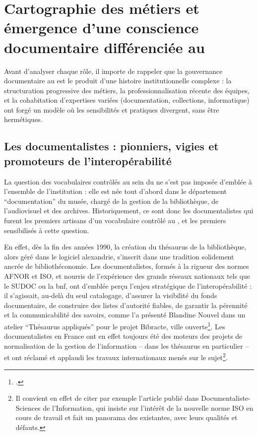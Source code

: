 \section{\label{II-B-1}Cartographie des métiers et émergence d’une conscience documentaire différenciée au \mae}

Avant d’analyser chaque rôle, il importe de rappeler que la gouvernance documentaire au \mae est le produit d’une histoire institutionnelle complexe : la structuration progressive des métiers, la professionnalisation récente des équipes, et la cohabitation d’expertises variées (documentation, collections, informatique) ont forgé un modèle où les sensibilités et pratiques divergent, sans être hermétiques.

\subsection{Les documentalistes : pionniers, vigies et promoteurs de l’interopérabilité}

La question des vocabulaires contrôlés au sein du \mae ne s’est pas imposée d’emblée à l’ensemble de l’institution : elle est née tout d'abord dans le département \enquote{documentation} du musée, chargé de la gestion de la bibliothèque, de l'audiovisuel et des archives. Historiquement, ce sont donc les documentalistes qui furent les premiers artisans d'un vocabulaire contrôlé au \mae, et les premiers sensibilisés à cette question.

En effet, dès la fin des années 1990, la création du thésaurus de la bibliothèque, alors géré dans le logiciel \gls{alexandrie}, s’inscrit dans une tradition solidement ancrée de bibliothéconomie. Les documentalistes, formés à la rigueur des normes AFNOR et ISO, et nourris de l’expérience des grands réseaux nationaux tels que le SUDOC ou la \ac{bnf}, ont d’emblée perçu l’enjeu stratégique de l’interopérabilité : il s’agissait, au-delà du seul catalogage, d’assurer la visibilité du fonds documentaire, de construire des listes d’autorité fiables, de garantir la pérennité et la communicabilité des savoirs, comme l'a présenté Blandine Nouvel dans un atelier \enquote{Thésaurus appliqués} pour le projet Bibracte, ville ouverte\footcite{nouvelOutilsDindexationBibliothecaires2022}. Les documentalistes en France ont en effet toujours été des moteurs des projets de normalisation de la gestion de l'information -- dans les thésaurus en particulier -- et ont réclamé et applaudi les travaux internationaux menés sur le sujet\footnote{Il convient en effet de citer par exemple l'article  publié dans Documentaliste-Sciences de l'Information, qui insiste sur l'intérêt de la nouvelle norme ISO en cours de travail et fait un panorama des existantes, avec leurs qualités et défauts.}.

